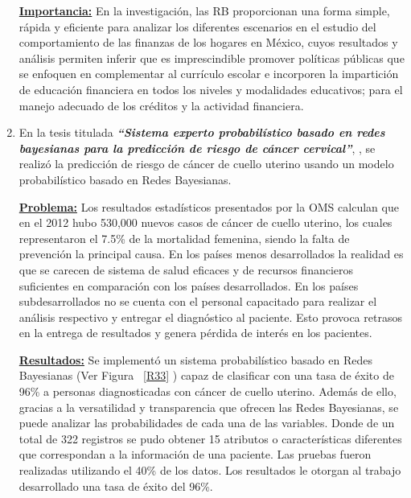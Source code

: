 \documentclass[10pt,conference]{IEEEtran}
\begin{document}
\begin{enumerate}
\textbf{\underline{Importancia:}}
En la investigación, las RB proporcionan una forma simple, rápida y eficiente para analizar los diferentes escenarios en el estudio del comportamiento de las finanzas de los hogares en México, cuyos resultados y análisis permiten inferir que es imprescindible promover políticas públicas que se enfoquen en complementar al currículo escolar e incorporen la impartición de educación financiera en todos los niveles y modalidades educativos; para el manejo adecuado de los créditos y la actividad financiera.

\item En la tesis titulada \textit{\textbf{“Sistema experto probabilístico basado en redes bayesianas para la predicción de riesgo de cáncer cervical”}}, \citep{paulino2019sistema}, se realizó la predicción de riesgo de cáncer de cuello uterino usando un modelo probabilístico basado en Redes Bayesianas.\par
\textbf{\underline{Problema:}}
Los resultados estadísticos presentados por la OMS calculan que en el 2012 hubo 530,000 nuevos casos de cáncer de cuello uterino, los cuales representaron el 7.5\% de la mortalidad femenina, siendo la falta de prevención la principal causa.
En los países menos desarrollados la realidad es que se carecen de sistema de salud eficaces y de recursos financieros suficientes en comparación con los países desarrollados. En los países subdesarrollados no se cuenta con el personal capacitado para realizar el análisis respectivo y entregar el diagnóstico al paciente. Esto provoca retrasos en la entrega de resultados y genera pérdida de interés en los pacientes. \par
\textbf{\underline{Resultados:}}
Se implementó un sistema probabilístico basado en Redes Bayesianas (Ver Figura  ~\ref{R33} ) capaz de clasificar con una tasa de éxito de 96\% a personas diagnosticadas con cáncer de cuello uterino. Además de ello, gracias a la versatilidad y transparencia que ofrecen las Redes Bayesianas, se puede analizar las probabilidades de cada una de las variables.  Donde de un total de 322 registros se pudo
obtener 15 atributos o características diferentes que correspondan a la información de una
paciente. Las pruebas fueron realizadas utilizando el 40\% de los datos. Los resultados le
otorgan al trabajo desarrollado una tasa de éxito del 96\%.\par


\end{enumerate}
\end{document}
